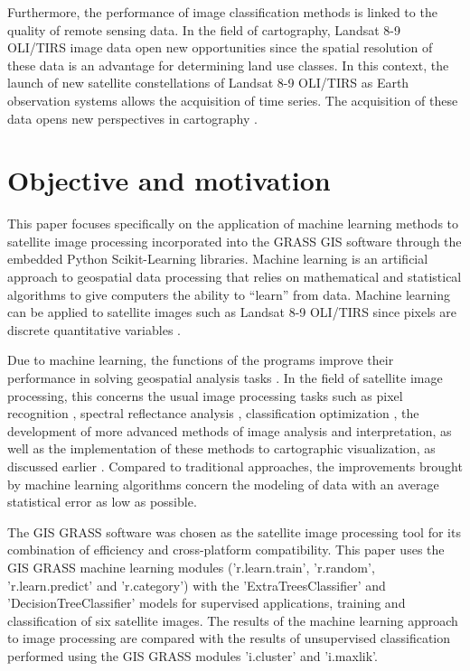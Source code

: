 \documentclass[geomatics,article,submit,pdftex,moreauthors]{Definitions/mdpi}
\begin{document}
Furthermore, the performance of image classification methods is linked to the quality of remote sensing data. In the field of cartography, Landsat 8-9 OLI/TIRS image data open new opportunities since the spatial resolution of these data is an advantage for determining land use classes. In this context, the launch of new satellite constellations of Landsat 8-9 OLI/TIRS as Earth observation systems allows the acquisition of time series. The acquisition of these data opens new perspectives in cartography \cite{Farah05012010,Lemenkova202322,Layati03042022,Layati28082024}.

\section{Objective and motivation}

This paper focuses specifically on the application of machine learning methods to satellite image processing incorporated into the GRASS GIS software through the embedded Python Scikit-Learning libraries. Machine learning is an artificial approach to geospatial data processing that relies on mathematical and statistical algorithms to give computers the ability to “learn” from data. Machine learning can be applied to satellite images such as Landsat 8-9 OLI/TIRS since pixels are discrete quantitative variables \cite{Lemenkova202026}.

Due to machine learning, the functions of the programs improve their performance in solving geospatial analysis tasks \cite{More02072020,Lemenkova202403,GarciaPedrero03042017}. In the field of satellite image processing, this concerns the usual image processing tasks such as pixel recognition \cite{NASIRI2023103555,EBRAHIMY2023103390}, spectral reflectance analysis \cite{FU2024104421}, classification optimization \cite{PADHY2024100278,Lemenkova202401}, the development of more advanced methods of image analysis and interpretation, as well as the implementation of these methods to cartographic visualization, as discussed earlier \cite{HABIB20231,Lemenkova202406,KHALDI2024104191}. Compared to traditional approaches, the improvements brought by machine learning algorithms concern the modeling of data with an average statistical error as low as possible.

The GIS GRASS software was chosen as the satellite image processing tool for its combination of efficiency and cross-platform compatibility. This paper uses the GIS GRASS machine learning modules ('r.learn.train', 'r.random', 'r.learn.predict' and 'r.category') with the 'ExtraTreesClassifier' and 'DecisionTreeClassifier' models for supervised applications, training and classification of six satellite images. The results of the machine learning approach to image processing are compared with the results of unsupervised classification performed using the GIS GRASS modules 'i.cluster' and 'i.maxlik'.
\end{document}
